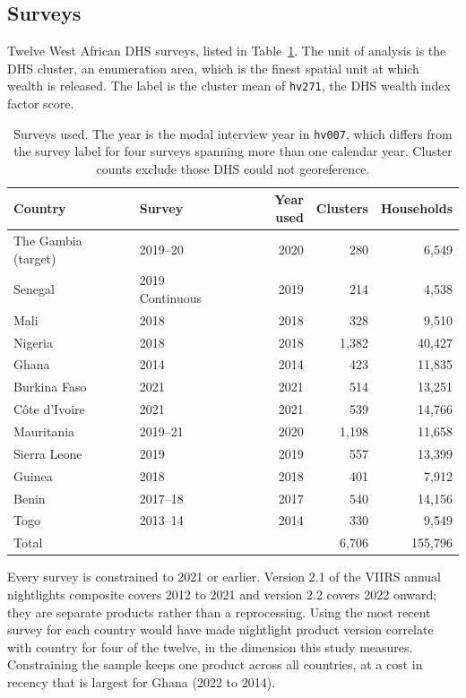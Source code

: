 \documentclass[11pt]{article}
\begin{document}
\subsection{Surveys}

Twelve West African DHS surveys, listed in Table~\ref{tab:surveys}. The unit of
analysis is the DHS cluster, an enumeration area, which is the finest spatial
unit at which wealth is released. The label is the cluster mean of \texttt{hv271},
the DHS wealth index factor score.

\begin{table}[t]
\centering
\small
\begin{tabular}{llrrr}
\toprule
Country & Survey & Year used & Clusters & Households \\
\midrule
The Gambia (target) & 2019--20 & 2020 & 280 & 6{,}549 \\
Senegal & 2019 Continuous & 2019 & 214 & 4{,}538 \\
Mali & 2018 & 2018 & 328 & 9{,}510 \\
Nigeria & 2018 & 2018 & 1{,}382 & 40{,}427 \\
Ghana & 2014 & 2014 & 423 & 11{,}835 \\
Burkina Faso & 2021 & 2021 & 514 & 13{,}251 \\
C\^ote d'Ivoire & 2021 & 2021 & 539 & 14{,}766 \\
Mauritania & 2019--21 & 2020 & 1{,}198 & 11{,}658 \\
Sierra Leone & 2019 & 2019 & 557 & 13{,}399 \\
Guinea & 2018 & 2018 & 401 & 7{,}912 \\
Benin & 2017--18 & 2017 & 540 & 14{,}156 \\
Togo & 2013--14 & 2014 & 330 & 9{,}549 \\
\midrule
Total & & & 6{,}706 & 155{,}796 \\
\bottomrule
\end{tabular}
\caption{Surveys used. The year is the modal interview year in \texttt{hv007},
which differs from the survey label for four surveys spanning more than one
calendar year. Cluster counts exclude those DHS could not georeference.}
\label{tab:surveys}
\end{table}

Every survey is constrained to 2021 or earlier. Version 2.1 of the VIIRS annual
nightlights composite covers 2012 to 2021 and version 2.2 covers 2022 onward;
they are separate products rather than a reprocessing. Using the most recent
survey for each country would have made nightlight product version correlate
with country for four of the twelve, in the dimension this study measures.
Constraining the sample keeps one product across all countries, at a cost in
recency that is largest for Ghana (2022 to 2014).
\end{document}
